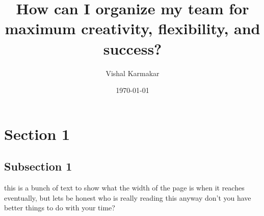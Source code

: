 \documentclass[a4paper, twoside]{article}
\date{\monthyeardate\today}
\author{Vishal  Karmakar}
\title{How can I organize my team
for maximum creativity, flexibility,
and success?}
\begin{document}

\section{Section 1}
\subsection{Subsection 1}
this is a bunch of text to show what the width of the page is when it reaches eventually, but lets be honest who is really reading this anyway don't you have better things to do with your time?\cite{Test}



\newpage
\printbibliography
\end{document}
